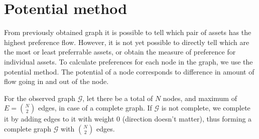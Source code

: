 \documentclass[lmodern, utf8, diplomski]{fer}
\newcommand{\graph}[1]{\mathcal{#1}}
\begin{document}
  
  

  \section{Potential method}
  \label{sec:metpot}
  From previously obtained graph it is possible to tell which pair of assets has the highest preference flow.
  However, it is not yet possible to directly tell which are the most or least preferrable assets, or obtain the measure of preference for individual assets.
  To calculate preferences for each node in the graph, we use the potential method\cite{caklovic}.
  The potential of a node corresponds to difference in amount of flow going in and out of the node.
  
  For the observed graph $\graph{G}$, let there be a total of $N$ nodes, and maximum of $E = \binom{N}{2}$ edges, in case of a complete graph.
  If $\graph{G}$ is not complete, we complete it by adding edges to it with weight 0 (direction doesn't matter),
  thus forming a complete graph $\graph{G}$ with $\binom{N}{2}$ edges.
  
\end{document}
